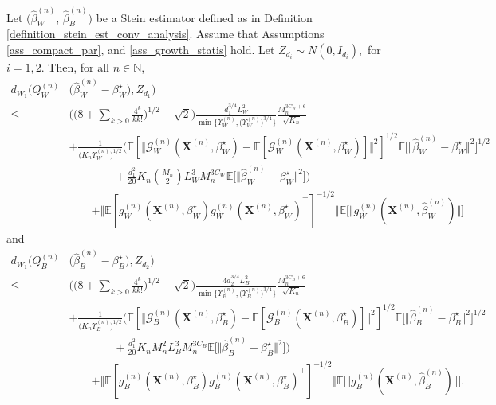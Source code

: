 \documentclass[10pt,a4paper]{amsart}
\begin{document}
\begin{Theorem} \label{theorem_asym_norm_bound}
    Let $(\hat{\beta}_W^{(n)}$, $\hat{\beta}_B^{(n)})$ be a Stein estimator defined as in Definition \ref{definition_stein_est_conv_analysis}. Assume that Assumptions \ref{ass_compact_par},   and \ref{ass_growth_statis}  hold. 
    Let $Z_{d_i} \sim N(0,I_{d_i}),$ for $i=1,2$. Then, for all $n \in \mathbb{N}$,
    \begin{align*}
        d_{W_1}\Big(Q_W^{(n)} &\big( \hat{\beta}_W^{(n)}-\beta_W^{\star}\big), Z_{d_1} \Big) \\
        \leq & \bigg(\bigg( 8+\sum_{k>0} \frac{4^k}{kk!} \bigg)^{1/2} + \sqrt{2}\bigg) \frac{d_1^{3/4} L_W^2}{\min\big\{\Upsilon_W^{(n)},\big(\Upsilon_W^{(n)}\big)^{3/4}\big\}} \frac{M_n^{3C_W+6} }{\sqrt{K_n}} \\
        & +\frac{1}{\big(K_n\Upsilon_W^{(n)}\big)^{1/2}} \bigg( \mathbb{E}[ \Vert \mathcal{G}_W^{(n)}(\mathbf{X}^{(n)},\beta_W^{\star}) - \mathbb{E}[\mathcal{G}_W^{(n)}(\mathbf{X}^{(n)},\beta_W^{\star})] \Vert^2 ]^{1/2} \mathbb{E}\big[ \Vert \hat{\beta}_W^{(n)} - \beta_W^{\star} \Vert^2 ]^{1/2} \\
        & \qquad \qquad+ \frac{d_1^2}{20} K_n \binom{M_n}{2}  L_W^3 M_n^{3C_W} \mathbb{E}\big[ \Vert \hat{\beta}_W^{(n)}-\beta_W^{\star}\Vert^2 \big] \bigg) \\
         & \qquad +\Vert \mathbb{E}[g_W^{(n)}(\mathbf{X}^{(n)},\beta_W^{\star})g_W^{(n)}(\mathbf{X}^{(n)},\beta_W^{\star})^{\top}]^{-1/2} \Vert \mathbb{E}\big[\Vert g_W^{(n)}(\mathbf{X}^{(n)},\hat{\beta}_W^{(n)}) \Vert \big]
    \end{align*}
  and 
    \begin{align*}
        d_{W_1}\Big(Q_B^{(n)} &\big( \hat{\beta}_B^{(n)}-\beta_B^{\star}\big), Z_{d_2}  \Big) \\
        \leq & \bigg(\bigg( 8+\sum_{k>0} \frac{4^k}{kk!} \bigg)^{1/2} + \sqrt{2}\bigg) \frac{4d_2^{3/4} L_B^2}{\min\big\{\Upsilon_B^{(n)},\big(\Upsilon_B^{(n)}\big)^{3/4}\big\}} \frac{M_n^{3C_B+6} }{\sqrt{K_n}} \\
        &  +\frac{1}{\big( K_n\Upsilon_B^{(n)}\big)^{1/2}} \bigg( \mathbb{E}[ \Vert \mathcal{G}_B^{(n)}(\mathbf{X}^{(n)},\beta_B^{\star}) -\mathbb{E}[\mathcal{G}_B^{(n)}(\mathbf{X}^{(n)},\beta_B^{\star})]  \Vert^2 ]^{1/2} \mathbb{E}\big[ \Vert \hat{\beta}_B^{(n)} - \beta_B^{\star} \Vert^2 ]^{1/2} \\
        & \qquad \qquad+ \frac{d_1^2}{20} K_n M_n^2  L_B^3 M_n^{3C_B} \mathbb{E}\big[ \Vert \hat{\beta}_B^{(n)}-\beta_B^{\star}\Vert^2 \big] \bigg) \\
        & \qquad +\Vert \mathbb{E}[g_B^{(n)}(\mathbf{X}^{(n)},\beta_B^{\star})g_B^{(n)}(\mathbf{X}^{(n)},\beta_B^{\star})^{\top}]^{-1/2} \Vert \mathbb{E}\big[\Vert g_B^{(n)}(\mathbf{X}^{(n)},\hat{\beta}_B^{(n)}) \Vert \big].
    \end{align*}
\end{Theorem}
\end{document}
